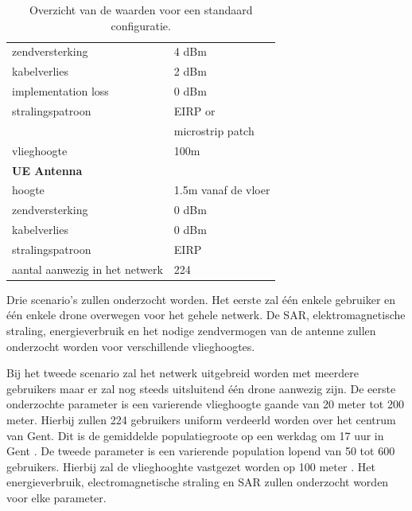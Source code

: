 \documentclass[twocolumn]{phdsymp} %
\begin{document}
\begin{table}[!htb]
\begin{tabular}[t]{ll}
        \hspace{3mm}  zendversterking           & 4 dBm   \\ 
        \hspace{3mm}  kabelverlies               & 2 dBm   \\ 
        \hspace{3mm}  implementation loss       & 0 dBm   \\
        \hspace{3mm}  stralingspatroon         & EIRP or\\
         \hspace{3mm}                           & microstrip patch\\
        \hspace{3mm}  vlieghoogte                & 100m  \\
        \hline
        \multicolumn{2}{l}{\textbf{UE Antenna}} \\
        \hline 
        \hspace{3mm} hoogte                     & 1.5m vanaf de vloer      \\ 
        \hspace{3mm} zendversterking                      & 0 dBm   \\ 
        \hspace{3mm} kabelverlies              & 0 dBm   \\ 
        \hspace{3mm} stralingspatroon         & EIRP  \\
        \hspace{3mm} aantal aanwezig in het netwerk         & 224  \\
        \toprule
\end{tabular}
\caption{Overzicht van de waarden voor een standaard configuratie.}
\label{table:defaultconf}
\end{table}

Drie scenario's zullen onderzocht worden. Het eerste zal \'e\'en enkele gebruiker en 
 \'e\'en enkele drone overwegen 
voor het gehele netwerk. De \gls{SAR}, elektromagnetische straling, energieverbruik  en 
het nodige zendvermogen van de antenne zullen onderzocht worden voor verschillende vlieghoogtes.

Bij het tweede scenario zal het netwerk uitgebreid worden met meerdere gebruikers maar 
er zal nog steeds uitsluitend  \'e\'en drone aanwezig zijn. De eerste onderzochte parameter 
is een varierende vlieghoogte gaande van 20 meter tot 200 meter. Hierbij zullen 224 gebruikers 
uniform verdeerld worden over het centrum van Gent. Dit is de gemiddelde populatiegroote op 
een werkdag om 17 uur in Gent \cite{J2}.
De tweede parameter is een varierende population lopend van 50 tot 600 gebruikers. Hierbij 
zal de vlieghooghte vastgezet worden op 100 meter \cite{J2}.
Het energieverbruik, electromagnetische straling en \gls{SAR} zullen onderzocht worden 
voor elke parameter.
\end{document}

